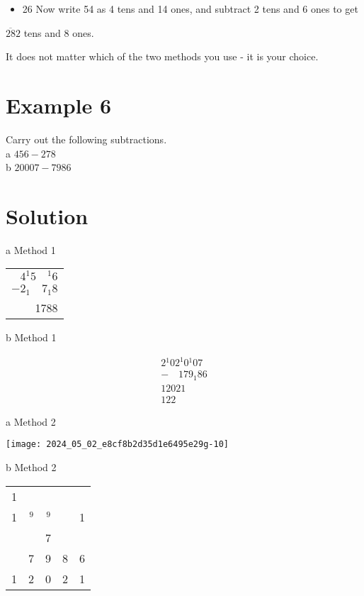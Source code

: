\documentclass[10pt]{article}
\begin{document}
\begin{itemize}
  \item 26 Now write 54 as 4 tens and 14 ones, and subtract 2 tens and 6 ones to get
\end{itemize}

\(\overline{28} 2\) tens and 8 ones.

It does not matter which of the two methods you use - it is your choice.

\section*{Example 6}
Carry out the following subtractions.\\
a \(456-278\)\\
b \(20007-7986\)

\section*{Solution}
a Method 1

\begin{center}
\begin{tabular}{r}
\(4{ }^{1} 5 \quad{ }^{1} 6\) \\
\(-2_{1} \quad 7_{1} 8\) \\
\hline
1788 \\
\hline
\end{tabular}
\end{center}

b Method 1

\[
\begin{array}{r}
2{ }^{1} 02^{1} 0{ }^{1} 07 \\
-\quad 179_{1} 86 \\
\hline 12021 \\
\hline 122
\end{array}
\]

a Method 2

\begin{center}
\texttt{[image: 2024\_05\_02\_e8cf8b2d35d1e6495e29g-10]}
\end{center}

b Method 2

\begin{center}
\begin{tabular}{rrrrr}
1 &  &  &  &  \\
1 & \({ }^{9}\) & \({ }^{9}\) &  & 1 \\
 &  & 7 &  &  \\
 & 7 & 9 & 8 & 6 \\
\hline
1 & 2 & 0 & 2 & 1 \\
\hline
\end{tabular}
\end{center}
\end{document}
